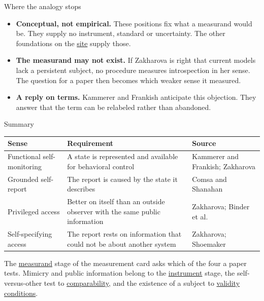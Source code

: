 \documentclass[aspectratio=169,11pt]{beamer}
\newcommand{\partslide}[2]{%
\begin{frame}[plain,label=#1]
\vfill
\begin{center}
  \setlength{\fboxrule}{2.5pt}%
  \fcolorbox{black}{white}{\parbox{0.65\textwidth}{\centering\vspace{0.8em}
    {\Large\bfseries #2}
  \vspace{0.8em}}}
\end{center}
\vfill
\end{frame}}
\newcommand{\site}{https://measuring-self-reports.github.io/measuring-self-reports}
\begin{document}
\partslide{part6}{Part 6\\[0.5em]{\large\mdseries Limits}}

\begin{frame}[label=limits]{Where the analogy stops}
\begin{itemize}\setlength\itemsep{10pt}
  \item {\small \textbf{Conceptual, not empirical.} These positions fix what a measurand would be. They supply no instrument, standard or uncertainty. The other foundations on the \href{\site/}{site} supply those.}
  \item {\small \textbf{The measurand may not exist.} If Zakharova is right that current models lack a persistent subject, no procedure measures introspection in her sense. The question for a paper then becomes which weaker sense it measured.}
  \item {\small \textbf{A reply on terms.} Kammerer and Frankish anticipate this objection. They answer that the term can be relabeled rather than abandoned.}
\end{itemize}
\end{frame}

\begin{frame}[label=summary]{Summary}
\begin{center}
{\footnotesize\renewcommand{\arraystretch}{1.15}
\begin{tabular}{L{3.0cm}L{6.3cm}L{3.3cm}}
\toprule
\textbf{Sense} & \textbf{Requirement} & \textbf{Source} \\
\midrule
Functional self-monitoring & A state is represented and available for behavioral control & Kammerer and Frankish; Zakharova \\
Grounded self-report & The report is caused by the state it describes & Comsa and Shanahan \\
Privileged access & Better on itself than an outside observer with the same public information & Zakharova; Binder et al. \\
Self-specifying access & The report rests on information that could not be about another system & Zakharova; Shoemaker \\
\bottomrule
\end{tabular}
}
\end{center}

\vspace{0.2em}
{\footnotesize The \href{\site/measurement-card/measurand/}{measurand} stage of the measurement card asks which of the four a paper tests. Mimicry and public information belong to the \href{\site/measurement-card/instrument/}{instrument} stage, the self-versus-other test to \href{\site/measurement-card/comparability/}{comparability}, and the existence of a subject to \href{\site/measurement-card/validity-conditions/}{validity conditions}.}
\end{frame}
\end{document}
